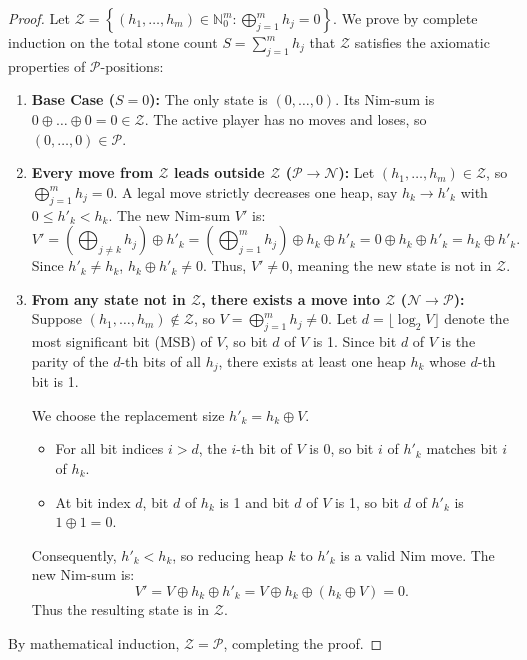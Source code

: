 ﻿\documentclass[a4paper]{article}
\begin{document}
\begin{proof}
Let $\mathcal{Z} = \left\{ (h_1, \dots, h_m) \in \mathbb{N}_0^m : \bigoplus_{j=1}^m h_j = 0 \right\}$. We prove by complete induction on the total stone count $S = \sum_{j=1}^m h_j$ that $\mathcal{Z}$ satisfies the axiomatic properties of $\mathcal{P}$-positions:

\begin{enumerate}
    \item \textbf{Base Case ($S = 0$):} The only state is $(0, \dots, 0)$. Its Nim-sum is $0 \oplus \dots \oplus 0 = 0 \in \mathcal{Z}$. The active player has no moves and loses, so $(0, \dots, 0) \in \mathcal{P}$.

    \item \textbf{Every move from $\mathcal{Z}$ leads outside $\mathcal{Z}$ ($\mathcal{P} \to \mathcal{N}$):}
    Let $(h_1, \dots, h_m) \in \mathcal{Z}$, so $\bigoplus_{j=1}^m h_j = 0$. A legal move strictly decreases one heap, say $h_k \to h'_k$ with $0 \le h'_k < h_k$. The new Nim-sum $V'$ is:
    \begin{equation}
    V' = \left( \bigoplus_{j \ne k} h_j \right) \oplus h'_k = \left( \bigoplus_{j=1}^m h_j \right) \oplus h_k \oplus h'_k = 0 \oplus h_k \oplus h'_k = h_k \oplus h'_k.
    \end{equation}
    Since $h'_k \ne h_k$, $h_k \oplus h'_k \ne 0$. Thus, $V' \ne 0$, meaning the new state is not in $\mathcal{Z}$.

    \item \textbf{From any state not in $\mathcal{Z}$, there exists a move into $\mathcal{Z}$ ($\mathcal{N} \to \mathcal{P}$):}
    Suppose $(h_1, \dots, h_m) \notin \mathcal{Z}$, so $V = \bigoplus_{j=1}^m h_j \ne 0$. Let $d = \lfloor \log_2 V \rfloor$ denote the most significant bit (MSB) of $V$, so bit $d$ of $V$ is 1.
    Since bit $d$ of $V$ is the parity of the $d$-th bits of all $h_j$, there exists at least one heap $h_k$ whose $d$-th bit is 1.
    
    We choose the replacement size $h'_k = h_k \oplus V$.
    \begin{itemize}
        \item For all bit indices $i > d$, the $i$-th bit of $V$ is 0, so bit $i$ of $h'_k$ matches bit $i$ of $h_k$.
        \item At bit index $d$, bit $d$ of $h_k$ is 1 and bit $d$ of $V$ is 1, so bit $d$ of $h'_k$ is $1 \oplus 1 = 0$.
    \end{itemize}
    Consequently, $h'_k < h_k$, so reducing heap $k$ to $h'_k$ is a valid Nim move. The new Nim-sum is:
    \begin{equation}
    V' = V \oplus h_k \oplus h'_k = V \oplus h_k \oplus (h_k \oplus V) = 0.
    \end{equation}
    Thus the resulting state is in $\mathcal{Z}$.
\end{enumerate}

By mathematical induction, $\mathcal{Z} = \mathcal{P}$, completing the proof.
\end{proof}
\end{document}
